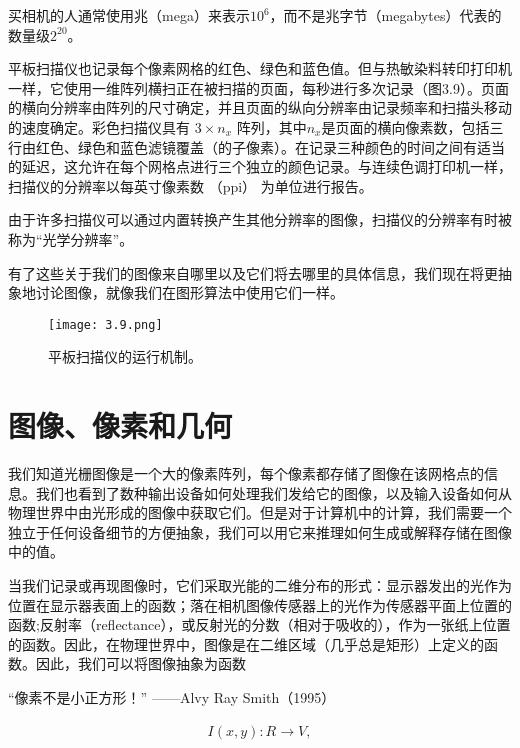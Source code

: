 \documentclass[lang=cn,12pt]{elegantbook}
\begin{document}
\begin{note}
  买相机的人通常使用兆（mega）来表示$10^6$，而不是兆字节（megabytes）代表的数量级$2^{20}$。
\end{note}

平板扫描仪也记录每个像素网格的红色、绿色和蓝色值。但与热敏染料转印打印机一样，它使用一维阵列横扫正在被扫描的页面，每秒进行多次记录（图3.9）。页面的横向分辨率由阵列的尺寸确定，并且页面的纵向分辨率由记录频率和扫描头移动的速度确定。彩色扫描仪具有 $3\times n_x$ 阵列，其中$n_x$是页面的横向像素数，包括三行由红色、绿色和蓝色滤镜覆盖（的子像素）。在记录三种颜色的时间之间有适当的延迟，这允许在每个网格点进行三个独立的颜色记录。与连续色调打印机一样，扫描仪的分辨率以每英寸像素数 （ppi） 为单位进行报告。

\begin{note}
  由于许多扫描仪可以通过内置转换产生其他分辨率的图像，扫描仪的分辨率有时被称为“光学分辨率”。
\end{note}

有了这些关于我们的图像来自哪里以及它们将去哪里的具体信息，我们现在将更抽象地讨论图像，就像我们在图形算法中使用它们一样。

\begin{figure}[htb]
  \centering
  \texttt{[image: 3.9.png]}
  \caption{平板扫描仪的运行机制。}
\end{figure}

\section{图像、像素和几何}

我们知道光栅图像是一个大的像素阵列，每个像素都存储了图像在该网格点的信息。我们也看到了数种输出设备如何处理我们发给它的图像，以及输入设备如何从物理世界中由光形成的图像中获取它们。但是对于计算机中的计算，我们需要一个独立于任何设备细节的方便抽象，我们可以用它来推理如何生成或解释存储在图像中的值。

当我们记录或再现图像时，它们采取光能的二维分布的形式：显示器发出的光作为位置在显示器表面上的函数；落在相机图像传感器上的光作为传感器平面上位置的函数;反射率（reflectance），或反射光的分数（相对于吸收的），作为一张纸上位置的函数。因此，在物理世界中，图像是在二维区域（几乎总是矩形）上定义的函数。因此，我们可以将图像抽象为函数

\begin{note}
  “像素不是小正方形！”  ——Alvy Ray Smith（1995）
\end{note}


\[
  \begin{aligned}
    I(x,y):R\rightarrow V,
  \end{aligned}
\]
\end{document}
